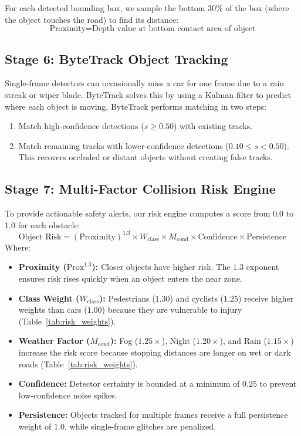 \documentclass{article}
\begin{document}
For each detected bounding box, we sample the bottom 30\% of the box (where the object touches the road) to find its distance:
\begin{equation}
\text{Proximity} = \text{Depth value at bottom contact area of object}
\end{equation}

\subsection{Stage 6: ByteTrack Object Tracking}
Single-frame detectors can occasionally miss a car for one frame due to a rain streak or wiper blade. ByteTrack solves this by using a Kalman filter to predict where each object is moving. ByteTrack performs matching in two steps:
\begin{enumerate}
    \item Match high-confidence detections ($s \ge 0.50$) with existing tracks.
    \item Match remaining tracks with lower-confidence detections ($0.10 \le s < 0.50$). This recovers occluded or distant objects without creating false tracks.
\end{enumerate}

\subsection{Stage 7: Multi-Factor Collision Risk Engine}
To provide actionable safety alerts, our risk engine computes a score from 0.0 to 1.0 for each obstacle:
\begin{equation}
\text{Object Risk} = (\text{Proximity})^{1.3} \times W_{\text{class}} \times M_{\text{cond}} \times \text{Confidence} \times \text{Persistence}
\end{equation}
Where:
\begin{itemize}
    \item \textbf{Proximity ($\text{Prox}^{1.3}$):} Closer objects have higher risk. The $1.3$ exponent ensures risk rises quickly when an object enters the near zone.
    \item \textbf{Class Weight ($W_{\text{class}}$):} Pedestrians ($1.30$) and cyclists ($1.25$) receive higher weights than cars ($1.00$) because they are vulnerable to injury (Table~\ref{tab:risk_weights}).
    \item \textbf{Weather Factor ($M_{\text{cond}}$):} Fog ($1.25\times$), Night ($1.20\times$), and Rain ($1.15\times$) increase the risk score because stopping distances are longer on wet or dark roads (Table~\ref{tab:risk_weights}).
    \item \textbf{Confidence:} Detector certainty is bounded at a minimum of $0.25$ to prevent low-confidence noise spikes.
    \item \textbf{Persistence:} Objects tracked for multiple frames receive a full persistence weight of $1.0$, while single-frame glitches are penalized.
\end{itemize}
\end{document}
